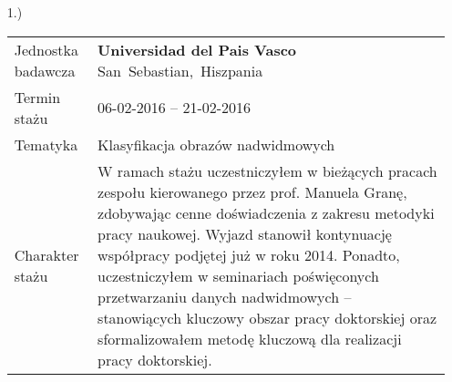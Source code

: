 \begin{itemize}
			\item[1.)]~\\
			\begin{tabular}{p{7em}p{20em}}
				Jednostka badawcza & \textbf{Universidad del Pais Vasco}\hspace{5em} San~Sebastian,~Hiszpania\\
				Termin stażu & 06-02-2016 -- 21-02-2016\\
				Tematyka & Klasyfikacja obrazów nadwidmowych\\
				Charakter stażu & W ramach stażu uczestniczyłem w bieżących pracach zespołu kierowanego przez prof. Manuela Granę, zdobywając cenne doświadczenia z zakresu metodyki pracy naukowej. Wyjazd stanowił kontynuację współpracy podjętej już w roku 2014. Ponadto, uczestniczyłem w seminariach poświęconych przetwarzaniu danych nadwidmowych -- stanowiących kluczowy obszar pracy doktorskiej oraz sformalizowałem metodę kluczową dla realizacji pracy doktorskiej.\\
				\end{tabular}
				
\end{itemize}

